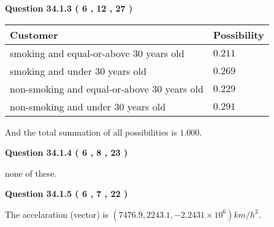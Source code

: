 \documentclass[12pt]{article}
\begin{document}
 
  
\vspace{0.2in}
  
{\textbf{\Large{Question
34.1.3 
 (           6 ,          12 ,          27 )
}}}
  
  
 
 
\noindent{}

 
\noindent
\begin{tabular}{|l|l|}
\hline
Customer & Possibility \\
\hline
smoking  and  %
equal-or-above 30 years old &
  $ %
0.211$ \\
\hline
smoking  and  %
under 30 years old &
  $ %
0.269$ \\
\hline
 non-smoking and  %
equal-or-above 30 years old &
  $ %
0.229$ \\
\hline
 non-smoking and  %
under 30 years old &
  $ %
0.291$ \\
\hline
\end{tabular}
 
\noindent
 And the total summation of all possibilities is $  %
1.000 $.
 
 
 
  
\vspace{0.2in}
  
{\textbf{\Large{Question
34.1.4 
 (           6 ,           8 ,          23 )
}}}
  
  
 
 
\noindent{}
 
 
none of these.
 
 
 
 
  
\vspace{0.2in}
  
{\textbf{\Large{Question
34.1.5 
 (           6 ,           7 ,          22 )
}}}
  
  
 
 
\noindent{}
 
 
The accelaration (vector) is
$(
7476.9,
2243.1 ,
-2.2431 \times 10^{6}
)km/h^2.
$
 
 
 
 
  
\vspace{0.2in}
  
\end{document}
